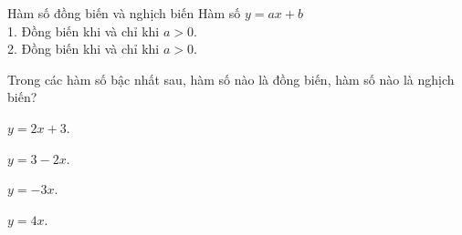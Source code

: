 \begin{dang}{Hàm số đồng biến và nghịch biến}
	Hàm số $y=ax+b$\\
	1. Đồng biến khi và chỉ khi $a>0$.\\
	2. Đồng biến khi và chỉ khi $a>0$.
\end{dang}
\begin{vd}
Trong các hàm số bậc nhất sau, hàm số nào là đồng biến, hàm số nào là nghịch biến?
\begin{enumEX}{2}
	\item $y=2x+3$.
	\item $y=3-2x$.
	\item $y=-3x$.
	\item $y=4x$.
\end{enumEX}
\end{vd}

